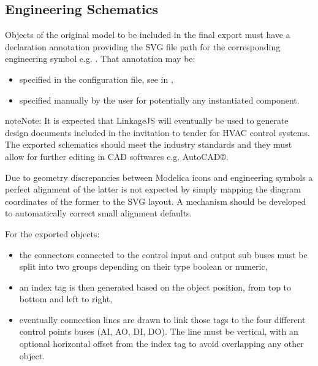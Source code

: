 \documentclass[letterpaper,10pt, openany,english]{sphinxmanual}
\begin{document}
\subsection{Engineering Schematics}
\label{\detokenize{requirements:engineering-schematics}}
Objects of the original model to be included in the final export must have a declaration annotation providing the SVG file path for the corresponding engineering symbol e.g. . That annotation may be:
\begin{itemize}
\item {} 
specified in the configuration file, see  in {\hyperref[\detokenize{requirements:configuration-api}]{}},

\item {} 
specified manually by the user for potentially any instantiated component.

\end{itemize}

\begin{sphinxadmonition}{note}{Note:}
It is expected that LinkageJS will eventually be used to generate design documents included in the invitation to tender for HVAC control systems. The exported schematics should meet the industry standards and they must allow for further editing in CAD softwares e.g. AutoCAD®.

Due to geometry discrepancies between Modelica icons and engineering symbols a perfect alignment of the latter is not expected by simply mapping the diagram coordinates of the former to the SVG layout. A mechanism should be developed to automatically correct small alignment defaults.
\end{sphinxadmonition}

For the exported objects:
\begin{itemize}
\item {} 
the connectors connected to the control input and output sub buses must be split into two groups depending on their type \textendash{} boolean or numeric,

\item {} 
an index tag is then generated based on the object position, from top to bottom and left to right,

\item {} 
eventually connection lines are drawn to link those tags to the four different control points buses (AI, AO, DI, DO). The line must be vertical, with an optional horizontal offset from the index tag to avoid overlapping any other object.

\end{itemize}
\end{document}
